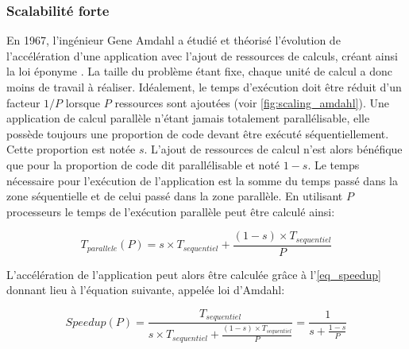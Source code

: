     \subsubsection{Scalabilité forte} 
        
        En 1967, l'ingénieur Gene Amdahl a étudié et théorisé l'évolution de l'accélération d'une application avec l'ajout de ressources de calculs, créant ainsi la loi éponyme \cite{Amdahl1967}. La taille du problème étant fixe, chaque unité de calcul a donc moins de travail à réaliser. Idéalement, le temps d'exécution doit être réduit d'un facteur $1/P$ lorsque $P$ ressources sont ajoutées (voir \autoref{fig:scaling_amdahl}). Une application de calcul parallèle n'étant jamais totalement parallélisable, elle possède toujours une proportion de code devant être exécuté séquentiellement. Cette proportion est notée $s$. L'ajout de ressources de calcul n'est alors bénéfique que pour la proportion de code dit parallélisable et noté $1-s$. Le temps nécessaire pour l'exécution de l'application est la somme du temps passé dans la zone séquentielle et de celui passé dans la zone parallèle. En utilisant $P$ processeurs le temps de l'exécution parallèle peut être calculé ainsi: 

        
            \begin{equation}
            T_{parallele}(P) = s \times T_{sequentiel} + \frac{(1-s) \times T_{sequentiel}}{P}
            \end{equation}
        
        L'accélération de l'application peut alors être calculée grâce à l'\autoref{eq_speedup} donnant lieu à l'équation suivante, appelée loi d'Amdahl:
        
                
            \begin{equation}
            \label{eq_amdahl}
            Speedup (P) = \frac{T_{sequentiel}}{s \times T_{sequentiel} + \frac{(1-s) \times T_{sequentiel}}{P}} =  \frac{1}{s + \frac{1-s}{P}}
            \end{equation}
        

